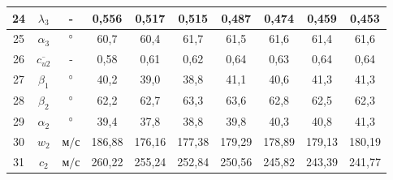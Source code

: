 \begin{landscape}
\begin{center}
\begin{longtable}{|c|c|c|c|c|c|c|c|c|c|}
				24 & $\lambda_3$ & - & 0,556 & 0,517 & 0,515 & 0,487 & 0,474 & 0,459 & 0,453 \\\hline
			
				25 & $\alpha_3$ & $\degree$ & 60,7 & 60,4 & 61,7 & 61,5 & 61,6 & 61,4 & 61,6 \\\hline
			
				26 & $\overline{c_{u2}}$ & - & 0,58 & 0,61 & 0,62 & 0,64 & 0,63 & 0,64 & 0,64 \\\hline
			
				27 & $\beta_1$ & $\degree$ & 40,2 & 39,0 & 38,8 & 41,1 & 40,6 & 41,3 & 41,3 \\\hline
			
				28 & $\beta_2$ & $\degree$ & 62,2 & 62,7 & 63,3 & 63,6 & 62,8 & 62,5 & 62,3 \\\hline
			
				29 & $\alpha_2$ & $\degree$ & 39,4 & 37,8 & 38,8 & 39,8 & 40,3 & 40,8 & 41,3 \\\hline
			
				30 & $w_2$ & $м/с$ & 186,88 & 176,16 & 177,38 & 179,29 & 178,89 & 179,13 & 180,19 \\\hline
			
				31 & $c_2$ & $м/с$ & 260,22 & 255,24 & 252,84 & 250,56 & 245,82 & 243,39 & 241,77 \\\hline
			
		\end{longtable}
	\end{center}
\end{landscape}
